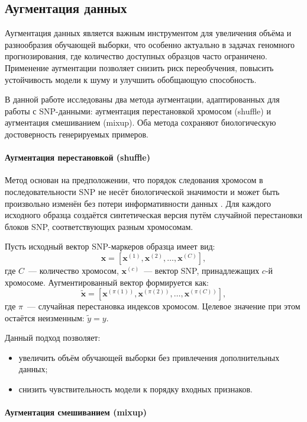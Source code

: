 \subsection{Аугментация данных}
\label{ch2:augmentation}

Аугментация данных является важным инструментом для увеличения объёма 
и разнообразия обучающей выборки, что особенно актуально в задачах 
геномного прогнозирования, где количество доступных образцов часто 
ограничено. Применение аугментации позволяет снизить риск переобучения, 
повысить устойчивость модели к шуму и улучшить обобщающую способность.

В данной работе исследованы два метода аугментации, адаптированных 
для работы с SNP-данными: аугментация перестановкой хромосом (shuffle) 
и аугментация смешиванием (mixup). Оба метода сохраняют биологическую 
достоверность генерируемых примеров.

\paragraph{Аугментация перестановкой (shuffle)}

Метод основан на предположении, что порядок следования хромосом в 
последовательности SNP не несёт биологической значимости и может быть 
произвольно изменён без потери информативности данных \cite{Ji2024}. Для каждого 
исходного образца создаётся синтетическая версия путём случайной 
перестановки блоков SNP, соответствующих разным хромосомам.

Пусть исходный вектор SNP-маркеров образца имеет вид:
\[
\mathbf{x} = [\mathbf{x}^{(1)}, \mathbf{x}^{(2)}, \dots, \mathbf{x}^{(C)}],
\]
где $C$~--- количество хромосом, $\mathbf{x}^{(c)}$~--- вектор SNP, 
принадлежащих $c$-й хромосоме. Аугментированный вектор формируется 
как:
\[
\tilde{\mathbf{x}} = [\mathbf{x}^{(\pi(1))}, \mathbf{x}^{(\pi(2))}, \dots, \mathbf{x}^{(\pi(C))}],
\]
где $\pi$~--- случайная перестановка индексов хромосом. Целевое 
значение при этом остаётся неизменным: $\tilde{y} = y$.

Данный подход позволяет:
\begin{itemize}
	\item увеличить объём обучающей выборки без привлечения дополнительных данных;
	\item снизить чувствительность модели к порядку входных признаков.
\end{itemize}

\paragraph{Аугментация смешиванием (mixup)}

